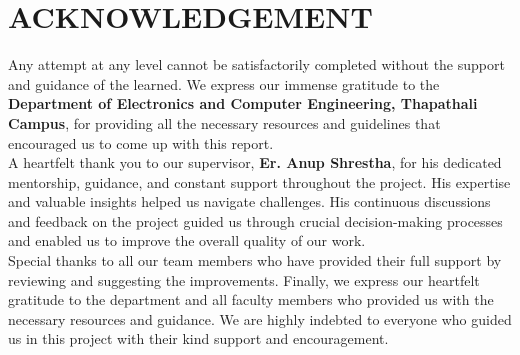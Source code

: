 \chapter*{ACKNOWLEDGEMENT}

Any attempt at any level cannot be satisfactorily completed without the support and guidance of the learned. We express our immense gratitude to the \textbf{Department of Electronics and Computer Engineering, Thapathali Campus}, for providing all the necessary resources and guidelines that encouraged us to come up with this report.\\[10pt]
A heartfelt thank you to our supervisor, \textbf{Er. Anup Shrestha}, for his dedicated mentorship, guidance, and constant support throughout the project. His expertise and valuable insights helped us navigate challenges. His continuous discussions and feedback on the project guided us through crucial decision-making processes and enabled us to improve the overall quality of our work.\\[10pt]
Special thanks to all our team members who have provided their full support by reviewing and suggesting the improvements. Finally, we express our heartfelt gratitude to the department and all faculty members who provided us with the necessary resources and guidance. We are highly indebted to everyone who guided us in this project with their kind support and encouragement.\\[15pt]
\authorTable